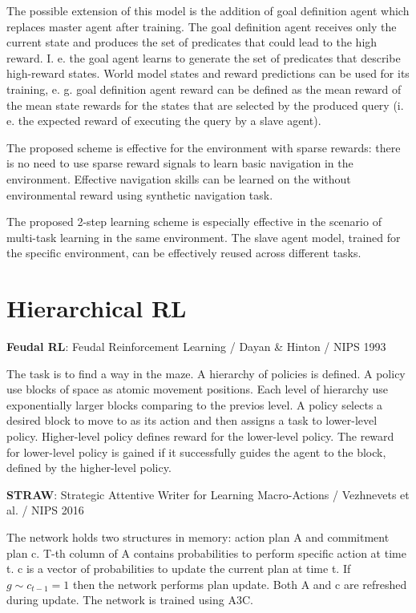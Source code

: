 \documentclass{article}
\begin{document}
The possible extension of this model is the addition of goal definition agent which replaces master agent after training. The goal definition agent receives only the current state and produces the set of predicates that could lead to the high reward. I. e. the goal agent learns to generate the set of predicates that describe high-reward states. World model states and reward predictions can be used for its training, e. g. goal definition agent reward can be defined as the mean reward of the mean state rewards for the states that are selected by the produced query (i. e. the expected reward of executing the query by a slave agent).

The proposed scheme is effective for the environment with sparse rewards: there is no need to use sparse reward signals to learn basic navigation in the environment. Effective navigation skills can be learned on the without environmental reward using synthetic navigation task.

The proposed 2-step learning scheme is especially effective in the scenario of multi-task learning in the same environment. The slave agent model, trained for the specific environment, can be effectively reused across different tasks.

\section{Hierarchical RL}

\textbf{Feudal RL}: Feudal Reinforcement Learning / Dayan \& Hinton / NIPS 1993

The task is to find a way in the maze. A hierarchy of policies is defined. A policy use blocks of space as atomic movement positions. Each level of hierarchy use exponentially larger blocks comparing to the previos level. A policy selects a desired block to move to as its action and then assigns a task to lower-level policy. Higher-level policy defines reward for the lower-level policy. The reward for lower-level policy is gained if it successfully guides the agent to the block, defined by the higher-level policy.

\textbf{STRAW}: Strategic Attentive Writer for Learning Macro-Actions / Vezhnevets et al. / NIPS 2016

The network holds two structures in memory: action plan A and commitment plan c. T-th column of A contains probabilities to perform specific action at time t. c is a vector of probabilities to update the current plan at time t. If $g \sim c_{t-1} = 1$ then the network performs plan update. Both A and c are refreshed during update. The network is trained using A3C.
\end{document}
